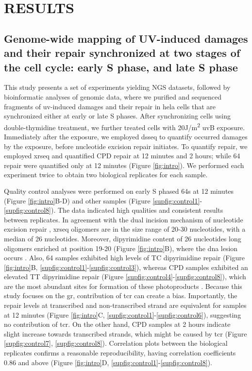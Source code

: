 \setlength{\parindent}{0pt}
\chapter{\bf RESULTS}

\section{Genome-wide mapping of UV-induced damages and their repair synchronized at two stages of the cell cycle: early S phase, and late S phase}

This study presents a set of experiments yielding NGS datasets, followed by bioinformatic analyses of genomic data, where we purified and sequenced fragments of \gls{uv}-induced damages and their repair in \gls{hela} cells that are synchronized either at early or late S phases. After synchronizing cells using double-thymidine treatment, we further treated cells with 20J/m\textsuperscript{2} \gls{uv}B exposure. Immediately after the exposure, we employed \gls{dsseq} to quantify occurred damages by the exposure, before nucleotide excision repair initiates. To quantify repair, we employed \gls{xrseq} and quantified \gls{CPD} repair at 12 minutes and 2 hours; while \gls{64} repair were quantified only at 12 minutes (Figure \ref{fig:intro}). We performed each experiment twice to obtain two biological replicates for each sample. 

Quality control analyses were performed on early S phased \gls{64}s at 12 minutes (Figure \ref{fig:intro}B-D) and other samples (Figure \ref{supfig:control1}-\ref{supfig:control8}). The data indicated high qualities and consistent results between replicates. In agreement with the dual incision mechanism of nucleotide excision repair \citep{huang1992human,li2017human,reardon2005nucleotide}, \gls{xrseq} oligomers are in the size range of 20-30 nucleotides, with a median of 26 nucleotides. Moreover, dipyrimidine content of 26 nucleotides long oligomers enriched at position 19-20 (Figure \ref{fig:intro}B), where the \gls{dna} lesion occurs \citep{huang1992human}. Also, \gls{64} samples exhibited high levels of \gls{T}\gls{C} dipyrimidine repair (Figure \ref{fig:intro}B, \ref{supfig:control1}-\ref{supfig:control3}), whereas \gls{CPD} samples exhibited an elevated \gls{T}\gls{T} dipyrimidine repair (Figure \ref{supfig:control4}-\ref{supfig:control8}), which are the most abundant sites for formation of these photoproducts \citep{mouret2010uva}. Because this study focuses on the \gls{gr}, contribution of \gls{tcr} can create a bias. Importantly, the repair levels at transcribed and non-transcribed strand are equivalent for samples at 12 minutes (Figure \ref{fig:intro}C, \ref{supfig:control1}-\ref{supfig:control6}), suggesting no contribution of \gls{tcr}. On the other hand, \gls{CPD} samples at 2 hours indicate slight increase towards transcribed strands, which might be caused by \gls{tcr} (Figure \ref{supfig:control7}, \ref{supfig:control8}). Correlation plots between the biological replicates confirms a reasonable reproducibility, having correlation coefficients 0.86 and above (Figure \ref{fig:intro}D, \ref{supfig:control1}-\ref{supfig:control8}). 

